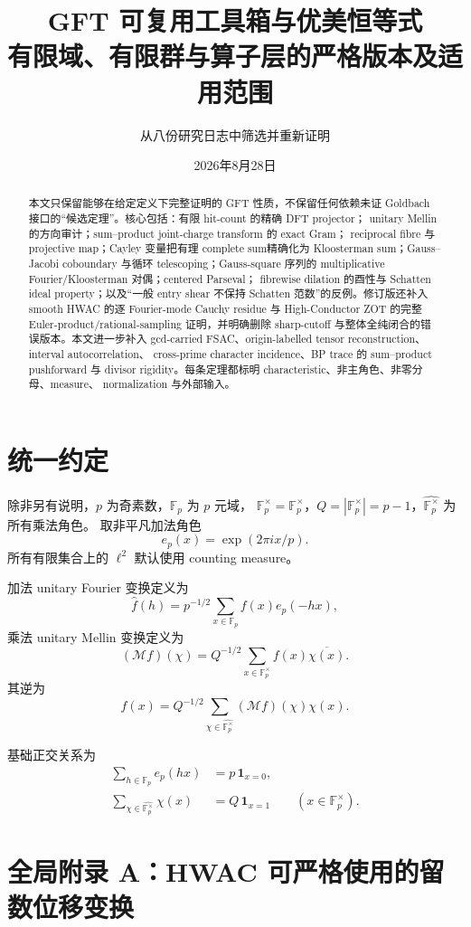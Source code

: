 \documentclass[11pt,a4paper]{ctexart}
\title{GFT 可复用工具箱与优美恒等式\\
\large 有限域、有限群与算子层的严格版本及适用范围}
\author{从八份研究日志中筛选并重新证明}
\date{2026年8月28日}
\theoremstyle{definition}
\newcommand{\F}{\mathbb F}
\newcommand{\G}{\F_p^\times}
\newcommand{\Gh}{\widehat{\G}}
\newcommand{\ep}{e_p}
\newcommand{\1}{\mathbf 1}
\begin{document}
\maketitle

\begin{abstract}
本文只保留能够在给定定义下完整证明的 GFT 性质，不保留任何依赖未证
Goldbach 接口的“候选定理”。核心包括：有限 hit-count 的精确 DFT projector；
unitary Mellin 的方向审计；sum--product joint-charge transform 的 exact Gram；
reciprocal fibre 与 projective map；Cayley 变量把有理 complete sum精确化为
Kloosterman sum；Gauss--Jacobi coboundary 与循环 telescoping；Gauss-square
序列的 multiplicative Fourier/Kloosterman 对偶；centered Parseval；
fibrewise dilation 的酉性与 Schatten ideal property；以及“一般 entry shear
不保持 Schatten 范数”的反例。修订版还补入 smooth HWAC 的逐 Fourier-mode
Cauchy residue 与 High-Conductor ZOT 的完整 Euler-product/rational-sampling
证明，并明确删除 sharp-cutoff 与整体全纯闭合的错误版本。本文进一步补入
gcd-carried FSAC、origin-labelled tensor reconstruction、interval autocorrelation、
cross-prime character incidence、BP trace 的 sum--product pushforward 与 divisor
rigidity。每条定理都标明 characteristic、非主角色、非零分母、measure、
normalization 与外部输入。
\end{abstract}

\section{统一约定}

除非另有说明，$p$ 为奇素数，$\F_p$ 为 $p$ 元域，
$\G=\F_p^\times$，$Q=|\G|=p-1$，$\Gh$ 为所有乘法角色。
取非平凡加法角色
\[
\ep(x)=\exp(2\pi i x/p).
\]
所有有限集合上的 $\ell^2$ 默认使用 counting measure。

加法 unitary Fourier 变换定义为
\[
\widehat f(h)=p^{-1/2}\sum_{x\in\F_p}f(x)\ep(-hx),
\tag{1.1}
\]
乘法 unitary Mellin 变换定义为
\[
(\mathcal M f)(\chi)=Q^{-1/2}\sum_{x\in\G}f(x)\overline{\chi(x)}.
\tag{1.2}
\]
其逆为
\[
f(x)=Q^{-1/2}\sum_{\chi\in\Gh}(\mathcal Mf)(\chi)\chi(x).
\tag{1.3}
\]

基础正交关系为
\begin{align}
\sum_{h\in\F_p}\ep(hx)&=p\,\1_{x=0},                 \tag{1.4}\\
\sum_{\chi\in\Gh}\chi(x)&=Q\,\1_{x=1}\qquad(x\in\G). \tag{1.5}
\end{align}

\section*{全局附录 A：HWAC 可严格使用的留数位移变换}
\end{document}
